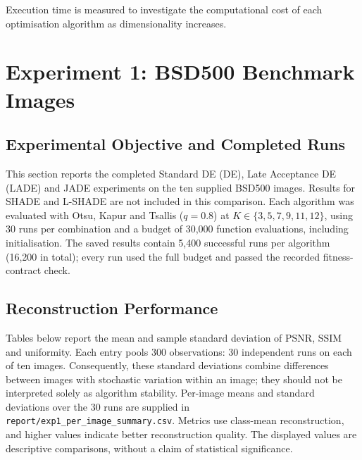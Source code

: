 \documentclass[review]{elsarticle}
\begin{document}
Execution time is measured to investigate the computational cost of
each optimisation algorithm as dimensionality increases.



 
\section{Experiment 1: BSD500 Benchmark Images}

\label{sec:experiment1}

\subsection{Experimental Objective and Completed Runs}

This section reports the completed Standard DE (DE), Late Acceptance DE (LADE) and JADE experiments on the ten supplied BSD500 images. Results for SHADE and L-SHADE are not included in this comparison. Each algorithm was evaluated with Otsu, Kapur and Tsallis ($q=0.8$) at $K\in\{3,5,7,9,11,12\}$, using 30 runs per combination and a budget of 30,000 function evaluations, including initialisation. The saved results contain 5,400 successful runs per algorithm (16,200 in total); every run used the full budget and passed the recorded fitness-contract check.

\subsection{Reconstruction Performance}

Tables below report the mean and sample standard deviation of PSNR, SSIM and uniformity. Each entry pools 300 observations: 30 independent runs on each of ten images. Consequently, these standard deviations combine differences between images with stochastic variation within an image; they should not be interpreted solely as algorithm stability. Per-image means and standard deviations over the 30 runs are supplied in \texttt{report/exp1\_per\_image\_summary.csv}. Metrics use class-mean reconstruction, and higher values indicate better reconstruction quality. The displayed values are descriptive comparisons, without a claim of statistical significance.
\end{document}
